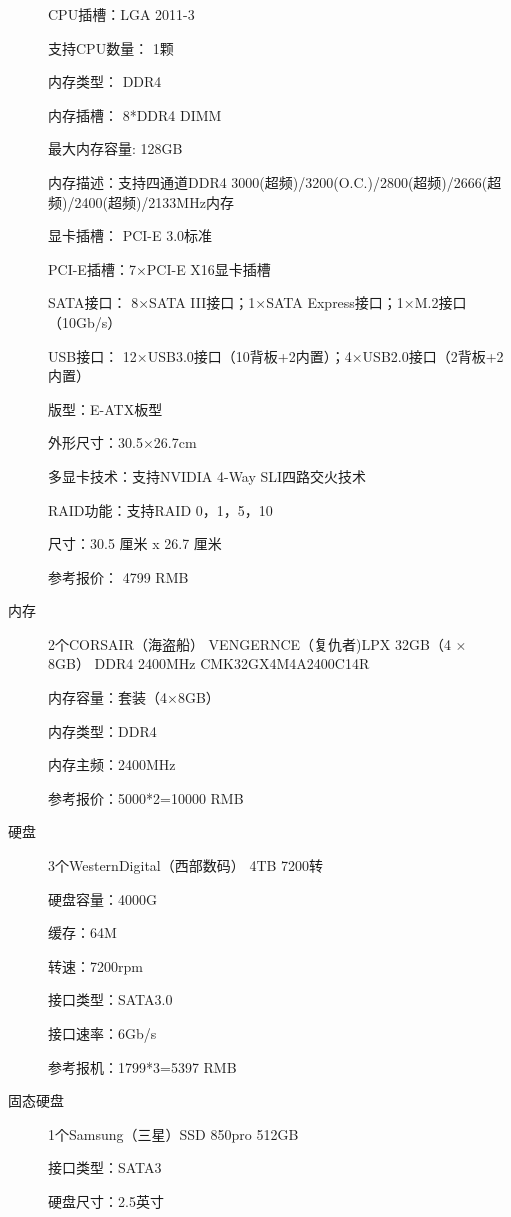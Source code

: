 \begin{description}
\begin{shaded}
{CPU插槽：LGA 2011-3

支持CPU数量： 1颗

内存类型： DDR4

内存插槽： 8*DDR4 DIMM

最大内存容量: 128GB

内存描述：支持四通道DDR4 3000(超频)/3200(O.C.)/2800(超频)/2666(超频)/2400(超频)/2133MHz内存

显卡插槽： PCI-E 3.0标准

PCI-E插槽：7×PCI-E X16显卡插槽

SATA接口： 8×SATA III接口；1×SATA Express接口；1×M.2接口（10Gb/s）

USB接口： 12×USB3.0接口（10背板+2内置）；4×USB2.0接口（2背板+2内置）

版型：E-ATX板型

外形尺寸：30.5×26.7cm 

多显卡技术：支持NVIDIA 4-Way SLI四路交火技术

RAID功能：支持RAID 0，1，5，10 

尺寸：30.5 厘米 x 26.7 厘米

参考报价： 4799 RMB} 
\end{shaded}   
\item[内存] 2个CORSAIR（海盗船） VENGERNCE（复仇者)LPX 32GB（4 $\times$ 8GB） DDR4 2400MHz CMK32GX4M4A2400C14R
\begin{shaded}
\scriptsize{
内存容量：套装（4×8GB）

内存类型：DDR4

内存主频：2400MHz

参考报价：5000*2=10000 RMB} 
\end{shaded} 
\item[硬盘] 3个WesternDigital（西部数码） 4TB 7200转
\begin{shaded}
\scriptsize{
硬盘容量：4000G

缓存：64M

转速：7200rpm

接口类型：SATA3.0

接口速率：6Gb/s

参考报机：1799*3=5397 RMB} 
\end{shaded} 
\item[固态硬盘] 1个Samsung（三星）SSD 850pro 512GB
\begin{shaded}
\scriptsize{
接口类型：SATA3

硬盘尺寸：2.5英寸

}
\end{shaded}
\end{description}
